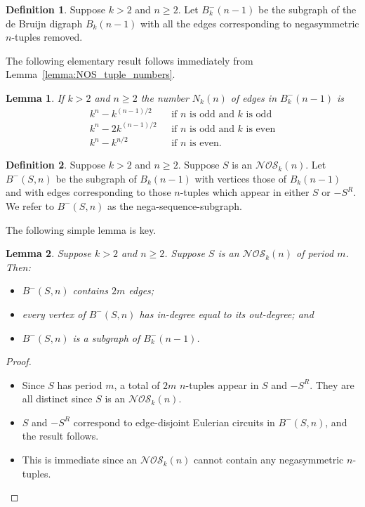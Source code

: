 \documentclass[a4paper,11pt]{article}
\theoremstyle{plain}
\newtheorem{lemma}{Lemma}[section]
\theoremstyle{definition}
\newtheorem{definition}{Definition}[section]
\theoremstyle{remark}
\begin{document}
\begin{definition}
Suppose $k>2$ and $n\geq2$.  Let $B_k^{-}(n-1)$ be the subgraph of the de Bruijn digraph
$B_k(n-1)$ with all the edges corresponding to negasymmetric $n$-tuples removed.
\end{definition}

The following elementary result follows immediately from Lemma~\ref{lemma:NOS_tuple_numbers}.

\begin{lemma}  \label{lemma:number_non-negasymmetric_tuples}
If $k>2$ and $n\geq2$ the number $N_k(n)$ of edges in $B_k^-(n-1)$ is
\begin{align*}
k^n-k^{(n-1)/2} & \mbox{~~if $n$ is odd and $k$ is odd} \\
k^n-2k^{(n-1)/2} & \mbox{~~if $n$ is odd and $k$ is even} \\
k^n-k^{n/2} & \mbox{~~if $n$ is even.}
\end{align*}
\end{lemma}

\begin{definition}
Suppose $k>2$ and $n\geq2$.  Suppose $S$ is an $\mathcal{NOS}_k(n)$.  Let $B^-(S,n)$ be the
subgraph of $B_k(n-1)$ with vertices those of $B_k(n-1)$ and with edges corresponding to those
$n$-tuples which appear in either $S$ or $-S^R$.  We refer to $B^-(S,n)$ as the
nega-sequence-subgraph.
\end{definition}

The following simple lemma is key.

\begin{lemma}  \label{lemma:B-Sn_basic_properties}
Suppose $k>2$ and $n\geq2$.  Suppose $S$ is an $\mathcal{NOS}_k(n)$ of period $m$.  Then:
\begin{itemize}
\item[i)] $B^-(S,n)$ contains $2m$ edges;
\item[ii)] every vertex of $B^-(S,n)$ has in-degree equal to its out-degree; and
\item[iii)] $B^-(S,n)$ is a subgraph of $B^-_k(n-1)$.
\end{itemize}
\end{lemma}

\begin{proof}
\begin{itemize}
\item[i)] Since $S$ has period $m$, a total of $2m$ $n$-tuples appear in $S$ and $-S^R$. They
    are all distinct since $S$ is an $\mathcal{NOS}_k(n)$.
\item[ii)] $S$ and $-S^R$ correspond to edge-disjoint Eulerian circuits in $B^-(S,n)$, and the
    result follows.
\item[iii)] This is immediate since an $\mathcal{NOS}_k(n)$ cannot contain any negasymmetric
    $n$-tuples.
\end{itemize}
\end{proof}
\end{document}
